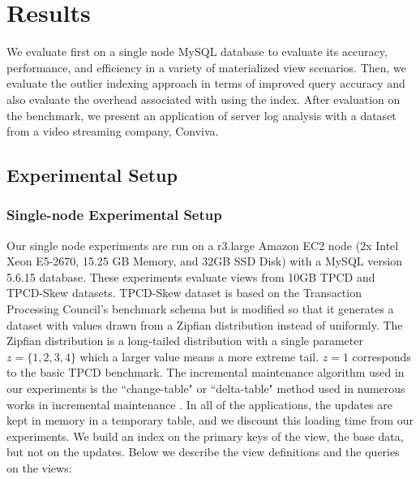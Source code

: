 \section{Results}
\label{exp}
We evaluate \svc first on a single node MySQL database to evaluate its accuracy, performance, and efficiency in a variety of materialized view 
scenarios.
Then, we evaluate the outlier indexing approach in terms of improved query accuracy and also evaluate the overhead associated with using the index.
After evaluation on the benchmark, we present an application of server log analysis with a dataset from a video streaming company, Conviva.

\subsection{Experimental Setup} %
\subsubsection{Single-node Experimental Setup}
Our single node experiments are run on a r3.large Amazon EC2 node (2x Intel Xeon E5-2670, 15.25 GB Memory, and 32GB SSD Disk) with a MySQL version 5.6.15 database.
These experiments evaluate views from 10GB TPCD and TPCD-Skew datasets.
TPCD-Skew dataset \cite{tpcdskew} is based on the Transaction Processing Council's benchmark
schema but is modified so that it generates a dataset with values drawn from a Zipfian distribution instead of uniformly.
The Zipfian distribution \cite{mitzenmacher2004brief} is a long-tailed distribution with a single parameter $z=\{1,2,3,4\}$ which a larger
value means a more extreme tail.
$z=1$ corresponds to the basic TPCD benchmark. 
The incremental maintenance algorithm used in our experiments is the ``change-table" or ``delta-table" method used in numerous works in incremental maintenance \cite{gupta1995maintenance,gupta2006incremental, DBLP:journals/vldb/KochAKNNLS14}.
In all of the applications, the updates are kept in memory in a temporary table, and we discount this loading time from our experiments.
We build an index on the primary keys of the view, the base data, but not on the updates.
Below we describe the view definitions and the queries on the views:

